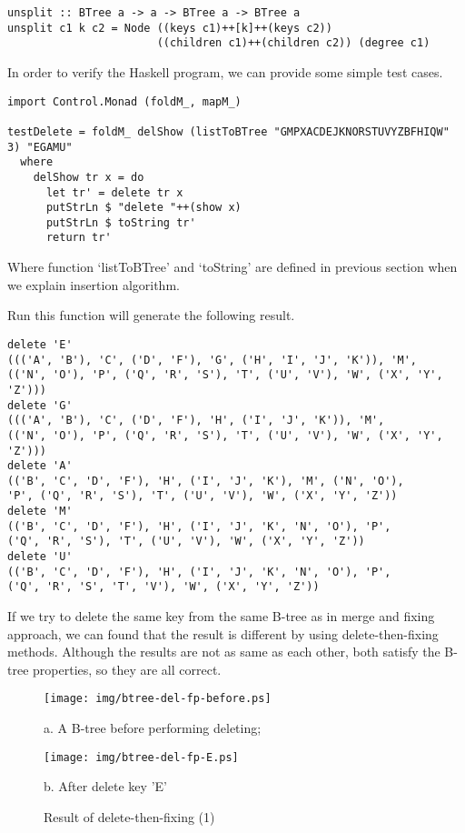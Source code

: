 \documentclass{article}
\begin{document}
\begin{lstlisting}
unsplit :: BTree a -> a -> BTree a -> BTree a
unsplit c1 k c2 = Node ((keys c1)++[k]++(keys c2))
                       ((children c1)++(children c2)) (degree c1)
\end{lstlisting}

In order to verify the Haskell program, we can provide some simple
test cases.

\begin{lstlisting}
import Control.Monad (foldM_, mapM_)

testDelete = foldM_ delShow (listToBTree "GMPXACDEJKNORSTUVYZBFHIQW" 3) "EGAMU" 
  where
    delShow tr x = do
      let tr' = delete tr x
      putStrLn $ "delete "++(show x)
      putStrLn $ toString tr'
      return tr'
\end{lstlisting}

Where function `listToBTree' and `toString' are defined in previous section when we
explain insertion algorithm.

Run this function will generate the following result.

\begin{verbatim}
delete 'E'
((('A', 'B'), 'C', ('D', 'F'), 'G', ('H', 'I', 'J', 'K')), 'M', 
(('N', 'O'), 'P', ('Q', 'R', 'S'), 'T', ('U', 'V'), 'W', ('X', 'Y', 'Z')))
delete 'G'
((('A', 'B'), 'C', ('D', 'F'), 'H', ('I', 'J', 'K')), 'M', 
(('N', 'O'), 'P', ('Q', 'R', 'S'), 'T', ('U', 'V'), 'W', ('X', 'Y', 'Z')))
delete 'A'
(('B', 'C', 'D', 'F'), 'H', ('I', 'J', 'K'), 'M', ('N', 'O'), 
'P', ('Q', 'R', 'S'), 'T', ('U', 'V'), 'W', ('X', 'Y', 'Z'))
delete 'M'
(('B', 'C', 'D', 'F'), 'H', ('I', 'J', 'K', 'N', 'O'), 'P', 
('Q', 'R', 'S'), 'T', ('U', 'V'), 'W', ('X', 'Y', 'Z'))
delete 'U'
(('B', 'C', 'D', 'F'), 'H', ('I', 'J', 'K', 'N', 'O'), 'P', 
('Q', 'R', 'S', 'T', 'V'), 'W', ('X', 'Y', 'Z'))
\end{verbatim}

If we try to delete the same key from the same B-tree as in merge and fixing
approach, we can found that the result is different by using delete-then-fixing
methods. Although the results are not as same as each other, both satisfy
the B-tree properties, so they are all correct.

\begin{figure}[htbp]
    \begin{center}
      \texttt{[image: img/btree-del-fp-before.ps]}

      a. A B-tree before performing deleting;

      \texttt{[image: img/btree-del-fp-E.ps]}

      b. After delete key 'E'
      \caption{Result of delete-then-fixing (1)} \label{fig:result-del-fp1}
    \end{center}
\end{figure}
\end{document}
